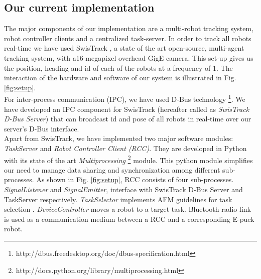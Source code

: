 \subsection{Our current implementation}
The major components of our implementation are a multi-robot tracking system, robot controller clients and a centralized task-server. In order to track all robots real-time we have used SwisTrack \cite{SwisTrack}, a state of the art open-source, multi-agent tracking system, with a16-megapixel overhead GigE camera. This set-up gives us the position, heading and id of each of the robots at a frequency of 1. The interaction of the hardware and software of our system is illustrated in Fig. \ref{fig:setup}. \\
For inter-process communication (IPC), we have used D-Bus technology \footnote{http://dbus.freedesktop.org/doc/dbus-specification.html}. We have developed an IPC component for SwisTrack (hereafter called as \textit{SwisTrack D-Bus Server}) that can broadcast id and pose of all robots in real-time over our server's D-Bus interface.\\
Apart from SwisTrack, we have implemented two major software modules: {\em TaskServer} and {\em Robot Controller Client (RCC)}. They are developed in Python with its state of the art \textit{Multiprocessing} \footnote{http://docs.python.org/library/multiprocessing.html} module. This python module simplifies our need to manage data sharing and synchronization among different sub-processes. As shown in Fig. \ref{fig:setup}, RCC consists of four sub-processes. {\em SignalListener} and {\em SignalEmitter}, interface with SwisTrack D-Bus Server and TaskServer respectively. {\em TaskSelector} implements AFM guidelines for task selection . {\em DeviceController} moves a robot to a target task. Bluetooth radio link is used as a communication medium between a RCC and a corresponding E-puck robot. 
